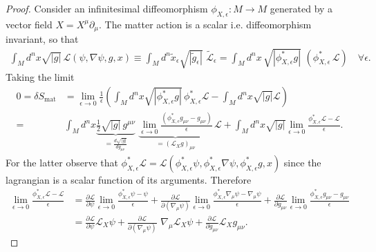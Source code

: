 \documentclass[../geometry_main.tex]{subfiles}
\begin{document}
\begin{proof}
%
Consider an infinitesimal diffeomorphism $\phi_{X,\epsilon}:M\to M$  generated by a vector field $X=X^\mu \partial_\mu$.
The matter action is a scalar i.e. diffeomorphism invariant, so that 
\begin{align}
    \int_M d^nx\sqrt{|g|}\,\mathcal{L}(\psi,\nabla\psi,g,x) \equiv \int_M \!\!\!d^n\tilde{x}_\epsilon\sqrt{|\tilde{g}_\epsilon|}\,\,\tilde{\mathcal{L}}_\epsilon 
    = \int_M \!\!\!d^nx\,\sqrt{|\phi_{X,\epsilon}^* g|}\,\,\left( \phi_{X,\epsilon}^*\, \mathcal{L}\right)
    \quad \forall \epsilon.
\end{align}
Taking the limit
\begin{align}
    0 = \delta S_\text{mat} &= \lim_{\epsilon\to 0} \frac{1}{\epsilon} \left( \int_M \!\!\!d^nx\sqrt{|\phi_{X,\epsilon}^* g|}\, \phi_{X,\epsilon}^* \mathcal{L} - \int_M \!\!\!d^nx\sqrt{|g|}\mathcal{L} \right)
    \\
    =& \int_M \!\!d^nx \underbrace{\tfrac{1}{2}\sqrt{|g|}\, g^{\mu\nu}}_{=\frac{d\sqrt{|g|}}{d g_{\mu\nu}}}\,\,\underbrace{\lim_{\epsilon\to 0}\frac{(\phi_{X,\epsilon}^*g_{\mu\nu}-g_{\mu\nu})}{\epsilon}}_{=(\mathcal{L}_Xg)_{\mu\nu}}\,\mathcal{L}
    + \int_M\!\! d^nx \sqrt{|g|} \lim_{\epsilon\to 0} \frac{\phi_{X,\epsilon}^* \mathcal{L} - \mathcal{L}}{\epsilon}.
\end{align}
For the latter observe that $\phi_{X,\epsilon}^* \mathcal{L} = \mathcal{L}(\phi_{X,\epsilon}^* \psi,\phi_{X,\epsilon}^* \nabla \psi, \phi_{X,\epsilon}^* g, x)$ since the lagrangian is a scalar function of its arguments.
Therefore 
\begin{align}
    \lim_{\epsilon\to 0} \frac{\phi_{X,\epsilon}^* \mathcal{L} - \mathcal{L}}{\epsilon} 
    &= \frac{\partial \mathcal{L}}{\partial \psi} \lim_{\epsilon\to 0} \frac{\phi_{X,\epsilon}^* \psi - \psi}{\epsilon}
    + \frac{\partial \mathcal{L}}{\partial (\nabla_\mu \psi)} \lim_{\epsilon\to 0} \frac{\phi_{X,\epsilon}^* \nabla_\mu\psi - \nabla_\mu \psi}{\epsilon}
    + \frac{\partial \mathcal{L}}{\partial g_{\mu\nu}} \lim_{\epsilon\to 0} \frac{\phi_{X,\epsilon}^* g_{\mu\nu}-g_{\mu\nu}}{\epsilon}
    \\
    &= \frac{\partial \mathcal{L}}{\partial \psi} \mathcal{L}_X \psi + \frac{\partial \mathcal{L}}{\partial (\nabla_\mu \psi)} \,\,\nabla_\mu\mathcal{L}_X \psi + \frac{\partial \mathcal{L}}{\partial g_{\mu\nu}} \mathcal{L}_X g_{\mu\nu}.
\end{align}


\end{proof}
\end{document}
